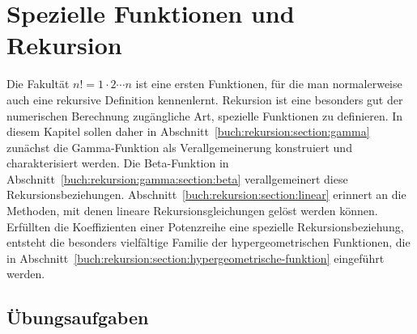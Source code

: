 %
%
%
\chapter{Spezielle Funktionen und Rekursion
\label{buch:chapter:rekursion}}
\rhead{}
Die Fakultät $n!=1\cdot 2\cdots n$ ist eine ersten Funktionen, für die
man normalerweise auch eine rekursive Definition kennenlernt.
Rekursion ist eine besonders gut der numerischen Berechnung zugängliche
Art, spezielle Funktionen zu definieren.
In diesem Kapitel sollen daher in
Abschnitt~\ref{buch:rekursion:section:gamma}
zunächst die Gamma-Funktion als Verallgemeinerung konstruiert
und charakterisiert werden.
Die Beta-Funktion in
Abschnitt~\ref{buch:rekursion:gamma:section:beta}
verallgemeinert diese Rekursionsbeziehungen.
Abschnitt~\ref{buch:rekursion:section:linear}
erinnert an die Methoden, mit denen lineare Rekursionsgleichungen
gelöst werden können. 
Erfüllten die Koeffizienten einer Potenzreihe eine spezielle
Rekursionsbeziehung, entsteht die besonders vielfältige Familie
der hypergeometrischen Funktionen, die in
Abschnitt~\ref{buch:rekursion:section:hypergeometrische-funktion}
eingeführt werden.






\section*{Übungsaufgaben}
\begin{uebungsaufgaben}
\end{uebungsaufgaben}

